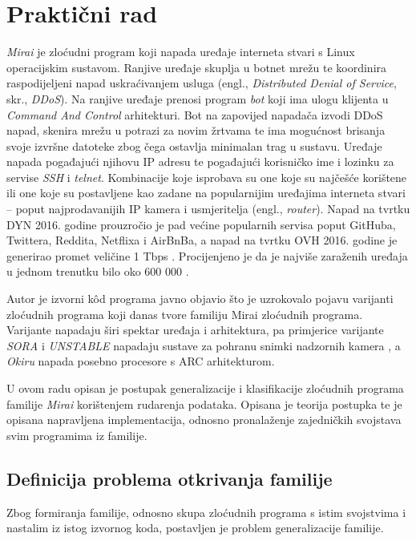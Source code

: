 \chapter{Praktični rad} \label{chapter_practical}

\textit{Mirai} je zloćudni program koji napada uređaje interneta stvari 
 s Linux operacijskim sustavom. Ranjive uređaje skuplja u botnet mrežu te 
 koordinira raspodijeljeni napad uskraćivanjem usluga (engl., \textit{Distributed Denial of 
 Service}, skr., \textit{DDoS}). Na ranjive uređaje prenosi program 
 \textit{bot} koji ima ulogu klijenta u \textit{Command And Control} 
 arhitekturi. Bot na zapovijed napadača izvodi DDoS napad, skenira mrežu u
 potrazi za novim žrtvama te ima mogućnost brisanja svoje izvršne datoteke 
 zbog čega ostavlja minimalan trag u sustavu. Uređaje napada pogađajući 
 njihovu IP adresu te pogađajući korisničko ime i lozinku za servise \textit{SSH} i 
 \textit{telnet}. Kombinacije koje isprobava su one koje su najčešće korištene ili one
 koje su postavljene kao zadane na popularnijim uređajima interneta stvari --
 poput najprodavanijih IP kamera i usmjeritelja (engl.,
 \textit{router}). Napad na tvrtku DYN 2016. godine prouzročio je pad većine
 popularnih servisa poput GitHuba, Twittera, Reddita, Netflixa i AirBnBa, a
 napad na tvrtku OVH 2016. godine je generirao promet veličine 1 Tbps 
 \cite{Ling2020}. Procijenjeno je da je najviše zaraženih uređaja u jednom
 trenutku bilo oko 600 000 \cite{Ling2020}.

 Autor je izvorni kôd programa javno objavio što je uzrokovalo pojavu 
 varijanti zloćudnih programa koji danas tvore familiju Mirai zloćudnih programa.
 Varijante napadaju širi spektar uređaja i arhitektura, pa primjerice varijante
 \textit{SORA} i \textit{UNSTABLE} napadaju sustave za pohranu snimki nadzornih
 kamera \cite{sora_unstable}, a \textit{Okiru} napada posebno procesore s ARC
 arhitekturom. 

U ovom radu opisan je postupak generalizacije i klasifikacije zloćudnih 
programa familije \textit{Mirai} korištenjem rudarenja podataka. Opisana je
teorija postupka te je opisana napravljena implementacija, odnosno pronalaženje
zajedničkih svojstava svim programima iz familije.

\section{Definicija problema otkrivanja familije}
Zbog formiranja familije, odnosno skupa zloćudnih programa s istim svojstvima i
nastalim iz istog izvornog koda, postavljen je problem generalizacije familije.

